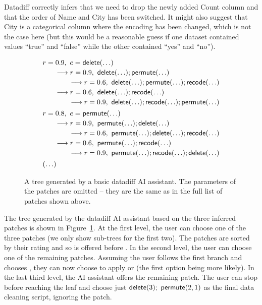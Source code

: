\documentclass{article}
\begin{document}
\noindent
Datadiff correctly infers that we need to drop the newly added {\ttfamily Count} column and that
the order of {\ttfamily Name} and {\ttfamily City} has been switched. It might also suggest that
{\ttfamily City} is a categorical column where the encoding has been changed, which is not the 
case here (but this would be a reasonable guess if one dataset contained values ``true'' and ``false''
while the other contained ``yes'' and ``no'').

\begin{figure}
\begin{equation*}
\begin{array}{l}
r=0.9,~ e=\textnormal{\sffamily delete}(\ldots)\\[0.2em]
\qquad\longrightarrow r=0.9,~ \textnormal{\sffamily delete}(\ldots); \textnormal{\sffamily permute}(\ldots)\\[0.2em]
\qquad\qquad\longrightarrow r=0.6,~ \textnormal{\sffamily delete}(\ldots); \textnormal{\sffamily permute}(\ldots); \textnormal{\sffamily recode}(\ldots)\\[0.2em]
\qquad\longrightarrow r=0.6,~ \textnormal{\sffamily delete}(\ldots); \textnormal{\sffamily recode}(\ldots)\\[0.2em]
\qquad\qquad\longrightarrow r=0.9,~ \textnormal{\sffamily delete}(\ldots); \textnormal{\sffamily recode}(\ldots); \textnormal{\sffamily permute}(\ldots)\\[0.4em]
r=0.8,~ e=\textnormal{\sffamily permute}(\ldots)\\[0.2em]
\qquad\longrightarrow r=0.9,~ \textnormal{\sffamily permute}(\ldots); \textnormal{\sffamily delete}(\ldots)\\[0.2em]
\qquad\qquad\longrightarrow r=0.6,~ \textnormal{\sffamily permute}(\ldots); \textnormal{\sffamily delete}(\ldots); \textnormal{\sffamily recode}(\ldots)\\[0.2em]
\qquad\longrightarrow r=0.6,~ \textnormal{\sffamily permute}(\ldots); \textnormal{\sffamily recode}(\ldots)\\[0.2em]
\qquad\qquad\longrightarrow r=0.9,~ \textnormal{\sffamily permute}(\ldots); \textnormal{\sffamily recode}(\ldots); \textnormal{\sffamily delete}(\ldots)\\[0.4em]
(\ldots)
\end{array}
\end{equation*}
\caption{A tree generated by a basic datadiff AI assistant. The parameters of the patches are
omitted -- they are the same as in the full list of patches shown above. }
\label{fig:ddtree}
\end{figure}

The tree generated by the datadiff AI assistant based on the three inferred patches is shown 
in Figure~\ref{fig:ddtree}.
At the first level, the user can choose one of the three patches (we only show sub-trees for the first two). 
The patches are sorted by their rating and so  is offered before . In the
second level, the user can choose one of the remaining patches. Assuming the user follows the first
branch and chooses , they can now choose to apply  or  (the
first option being more likely). In the last third level, the AI assistant offers the remaining patch. 
The user can stop before reaching the leaf and choose just $\textnormal{\sffamily delete}(3);~ \textnormal{\sffamily permute}(2,1)$ 
as the final data cleaning script, ignoring the  patch. 
\end{document}
